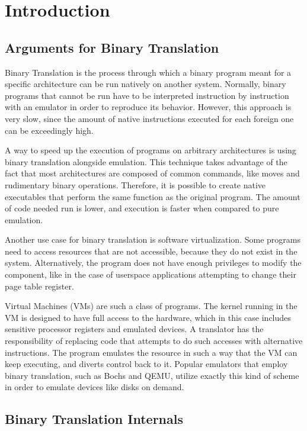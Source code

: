 \section{Introduction}

\subsection{Arguments for Binary Translation}

Binary Translation is the process through which a binary program meant for a
specific architecture can be run natively on another system.  Normally, binary
programs that cannot be run have to be interpreted instruction by instruction
with an emulator in order to reproduce its behavior.  However, this approach is
very slow, since the amount of native instructions executed for each foreign
one can be exceedingly high.

A way to speed up the execution of programs on arbitrary architectures is using
binary translation alongside emulation.  This technique takes advantage of the
fact that most architectures are composed of common commands, like moves and
rudimentary binary operations.  Therefore, it is possible to create native
executables that perform the same function as the original program.  The amount
of code needed run is lower, and execution is faster when compared to pure emulation.

Another use case for binary translation is software virtualization.  Some
programs need to access resources that are not accessible, because they do not
exist in the system.  Alternatively, the program does not have enough
privileges to modify the component, like in the case of userspace applications
attempting to change their page table register.

Virtual Machines (VMs) are such a class of programs.  The kernel running in the
VM is designed to have full access to the hardware, which in this case includes
sensitive processor registers and emulated devices.  A translator has the
responsibility of replacing code that attempts to do such accesses with
alternative instructions.  The program
emulates the resource in such a way that the VM can keep executing, and diverts
control back to it.  Popular emulators that employ binary translation, such as
Bochs\cite{lawton1996bochs} and QEMU\cite{bellard2005qemu}, utilize exactly this kind of scheme in order to emulate devices
like disks on demand.

\subsection{Binary Translation Internals}

